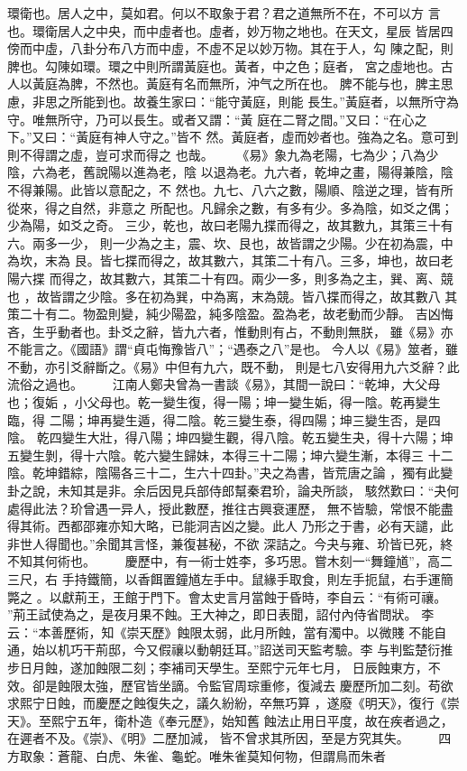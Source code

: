 \documentclass{ctexart}
\begin{document}
環衛也。居人之中，莫如君。何以不取象于君？君之道無所不在，不可以方 言也。環衛居人之中央，而中虛者也。虛者，妙万物之地也。在天文，星辰 皆居四傍而中虛，八卦分布八方而中虛，不虛不足以妙万物。其在于人，勾 陳之配，則脾也。勾陳如環。環之中則所謂黃庭也。黃者，中之色；庭者， 宮之虛地也。古人以黃庭為脾，不然也。黃庭有名而無所，沖气之所在也。 脾不能与也，脾主思慮，非思之所能到也。故養生家曰：``能守黃庭，則能 長生。''黃庭者，以無所守為守。唯無所守，乃可以長生。或者又謂：``黃 庭在二腎之間。''又曰：``在心之下。''又曰：``黃庭有神人守之。''皆不 然。黃庭者，虛而妙者也。強為之名。意可到則不得謂之虛，豈可求而得之 也哉。 　　《易》象九為老陽，七為少；八為少陰，六為老，舊說陽以進為老，陰 以退為老。九六者，乾坤之畫，陽得兼陰，陰不得兼陽。此皆以意配之，不 然也。九七、八六之數，陽順、陰逆之理，皆有所從來，得之自然，非意之 所配也。凡歸余之數，有多有少。多為陰，如爻之偶；少為陽，如爻之奇。 三少，乾也，故曰老陽九揲而得之，故其數九，其策三十有六。兩多一少， 則一少為之主，震、坎、艮也，故皆謂之少陽。少在初為震，中為坎，末為 艮。皆七揲而得之，故其數六，其策二十有八。三多，坤也，故曰老陽六揲 而得之，故其數六，其策二十有四。兩少一多，則多為之主，巽、离、競也 ，故皆謂之少陰。多在初為巽，中為离，末為競。皆八揲而得之，故其數八 其策二十有二。物盈則變，純少陽盈，純多陰盈。盈為老，故老動而少靜。 吉凶悔吝，生乎動者也。卦爻之辭，皆九六者，惟動則有占，不動則無朕， 雖《易》亦不能言之。《國語》謂``貞屯悔豫皆八''；``遇泰之八''是也。 今人以《易》筮者，雖不動，亦引爻辭斷之。《易》中但有九六，既不動， 則是七八安得用九六爻辭？此流俗之過也。 　　江南人鄭夬曾為一書談《易》，其間一說曰：``乾坤，大父母也；復姤 ，小父母也。乾一變生復，得一陽；坤一變生姤，得一陰。乾再變生臨，得 二陽；坤再變生遁，得二陰。乾三變生泰，得四陽；坤三變生否，是四陰。 乾四變生大壯，得八陽；坤四變生觀，得八陰。乾五變生夬，得十六陽；坤 五變生剝，得十六陰。乾六變生歸妹，本得三十二陽；坤六變生漸，本得三 十二陰。乾坤錯綜，陰陽各三十二，生六十四卦。''夬之為書，皆荒唐之論 ，獨有此變卦之說，未知其是非。余后因見兵部侍郎幫秦君玠，論夬所談， 駭然歎曰：``夬何處得此法？玠曾遇一异人，授此數歷，推往古興衰運歷， 無不皆驗，常恨不能盡得其術。西都邵雍亦知大略，已能洞吉凶之變。此人 乃形之于書，必有天譴，此非世人得聞也。''余聞其言怪，兼復甚秘，不欲 深詰之。今夬与雍、玠皆已死，終不知其何術也。 　　慶歷中，有一術士姓李，多巧思。嘗木刻一``舞鐘馗''，高二三尺，右 手持鐵簡，以香餌置鐘馗左手中。鼠緣手取食，則左手扼鼠，右手運簡斃之 。以獻荊王，王館于門下。會太史言月當蝕于昏時，李自云：``有術可禳。 ''荊王試使為之，是夜月果不蝕。王大神之，即日表聞，詔付內侍省問狀。 李云：``本善歷術，知《崇天歷》蝕限太弱，此月所蝕，當有濁中。以微賤 不能自通，始以机巧干荊邸，今又假禳以動朝廷耳。''詔送司天監考驗。李 与判監楚衍推步日月蝕，遂加蝕限二刻；李補司天學生。至熙宁元年七月， 日辰蝕東方，不效。卻是蝕限太強，歷官皆坐謫。令監官周琮重修，復減去 慶歷所加二刻。苟欲求熙宁日蝕，而慶歷之蝕復失之，議久紛紛，卒無巧算 ，遂廢《明天》，復行《崇天》。至熙宁五年，衛朴造《奉元歷》，始知舊 蝕法止用日平度，故在疾者過之，在遲者不及。《崇》、《明》二歷加減， 皆不曾求其所因，至是方究其失。 　　四方取象：蒼龍、白虎、朱雀、龜蛇。唯朱雀莫知何物，但謂鳥而朱者 
\end{document}
